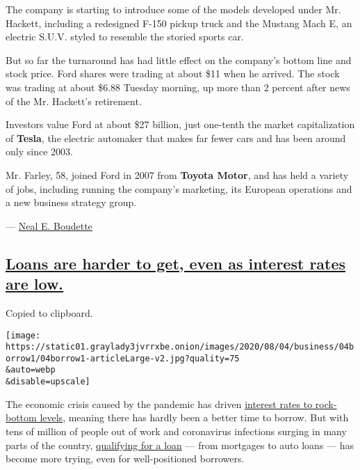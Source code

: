 The company is starting to introduce some of the models developed under
Mr. Hackett, including a redesigned F-150 pickup truck and the Mustang
Mach E, an electric S.U.V. styled to resemble the storied sports car.

But so far the turnaround has had little effect on the company's bottom
line and stock price. Ford shares were trading at about \$11 when he
arrived. The stock was trading at about \$6.88 Tuesday morning, up more
than 2 percent after news of the Mr. Hackett's retirement.

Investors value Ford at about \$27 billion, just one-tenth the market
capitalization of \textbf{Tesla}, the electric automaker that makes far
fewer cars and has been around only since 2003.

Mr. Farley, 58, joined Ford in 2007 from \textbf{Toyota Motor}, and has
held a variety of jobs, including running the company's marketing, its
European operations and a new business strategy group.

--- \href{https://www.nytimes3xbfgragh.onion/by/neal-e-boudette}{Neal E.
Boudette}

\hypertarget{loans-are-harder-to-get-even-as-interest-rates-are-low}{%
\subsection{\texorpdfstring{\protect\hyperlink{loans-are-harder-to-get-even-as-interest-rates-are-low}{Loans
are harder to get, even as interest rates are
low.}}{Loans are harder to get, even as interest rates are low.}}\label{loans-are-harder-to-get-even-as-interest-rates-are-low}}

Copied to clipboard.

\texttt{[image: https://static01.graylady3jvrrxbe.onion/images/2020/08/04/business/04borrow1/04borrow1-articleLarge-v2.jpg?quality=75\\\&auto=webp\\\&disable=upscale]}

The economic crisis caused by the pandemic has driven
\href{https://www.nytimes3xbfgragh.onion/2020/07/16/business/mortgage-rates-below-3-percent.html}{interest
rates to rock-bottom levels}, meaning there has hardly been a better
time to borrow. But with tens of million of people out of work and
coronavirus infections surging in many parts of the country,
\href{https://www.nytimes3xbfgragh.onion/2020/08/04/your-money/mortgage-loans-credit-cards-coronavirus.html}{qualifying
for a loan} --- from mortgages to auto loans --- has become more trying,
even for well-positioned borrowers.

